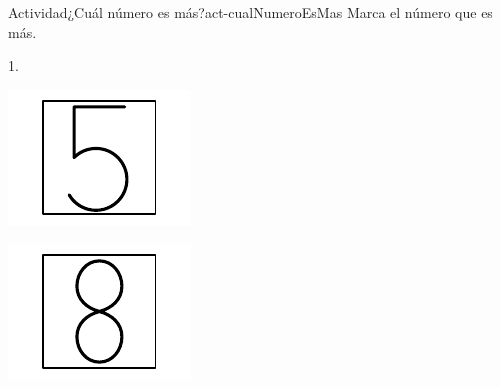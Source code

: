 \documentclass[20pt]{extarticle}
\begin{document}
\begin{activity}{Actividad}{¿Cuál número es más?}{act-cualNumeroEsMas}%
Marca el número que es más.%
\par
1.%
\begin{sidebyside}{2}{0}{0}{0}%
\begin{sbspanel}{0.5}%
\includegraphics[max width=\linewidth, center]{external/svg-source/tikz-file-148546.pdf}
\end{sbspanel}%
\begin{sbspanel}{0.5}%
\includegraphics[max width=\linewidth, center]{external/svg-source/tikz-file-148547.pdf}
\end{sbspanel}%
\end{sidebyside}%
\begin{image}{0}{1}{0}{}%

\end{image}
\end{activity}
\end{document}
